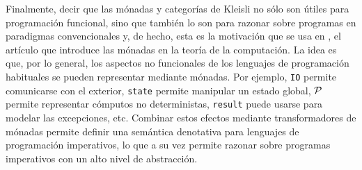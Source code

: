 Finalmente, decir que las mónadas y categorías de Kleisli no sólo son útiles
para programación funcional, sino que también lo son para razonar sobre
programas en paradigmas convencionales y, de hecho, esta es la motivación que se
usa en \cite{monads}, el artículo que introduce las mónadas en la teoría de la
computación. La idea es que, por lo general, los aspectos no funcionales de los
lenguajes de programación habituales se pueden representar mediante mónadas. Por
ejemplo, \texttt{IO} permite comunicarse con el exterior, \texttt{state} permite
manipular un estado global, $\mathcal{P}$ permite representar cómputos no
deterministas, \texttt{result} puede usarse para modelar las excepciones,
etc. Combinar estos efectos mediante transformadores de mónadas permite definir
una semántica denotativa para lenguajes de programación imperativos, lo que a su
vez permite razonar sobre programas imperativos con un alto nivel de abstracción.




